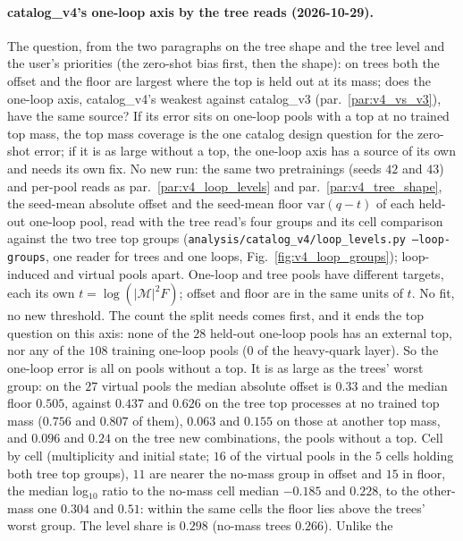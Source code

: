 \documentclass[11pt]{article}
\newcommand{\code}[1]{\texttt{#1}}
\begin{document}
\paragraph{catalog\_v4's one-loop axis by the tree reads (2026-10-29).}\label{par:v4_loop_groups} The question, from
the two paragraphs on the tree shape and the tree level and the user's priorities (the zero-shot bias first, then the
shape): on trees both the offset and the floor are largest where the top is held out at its mass; does the one-loop axis,
catalog\_v4's weakest against catalog\_v3 (par.~\ref{par:v4_vs_v3}), have the same source? If its error sits on one-loop
pools with a top at no trained top mass, the top mass coverage is the one catalog design question for the zero-shot
error; if it is as large without a top, the one-loop axis has a source of its own and needs its own fix. No new run:
the same two pretrainings (seeds $42$ and $43$) and per-pool reads as par.~\ref{par:v4_loop_levels} and
par.~\ref{par:v4_tree_shape}, the seed-mean absolute offset and the seed-mean floor $\mathrm{var}(q-t)$ of each held-out
one-loop pool, read with the tree read's four groups and its cell comparison against the two tree top groups
(\code{analysis/catalog\_v4/loop\_levels.py --loop-groups}, one reader for trees and one loops,
Fig.~\ref{fig:v4_loop_groups}); loop-induced and virtual pools apart. One-loop and tree pools have different targets,
each its own $t=\log(|\mathcal M|^2F)$; offset and floor are in the same units of $t$. No fit, no new threshold.
The count the split needs comes first, and it ends the top question on this axis: none of the $28$ held-out one-loop
pools has an external top, nor any of the $108$ training one-loop pools ($0$ of the heavy-quark layer). So the one-loop
error is all on pools without a top. It is as large as the trees' worst group: on the $27$ virtual pools the median
absolute offset is $0.33$ and the median floor $0.505$, against $0.437$ and $0.626$ on the tree top processes at no
trained top mass ($0.756$ and $0.807$ of them), $0.063$ and $0.155$ on those at another top mass, and $0.096$ and
$0.24$ on the tree new combinations, the pools without a top. Cell by cell (multiplicity and initial state; $16$ of the
virtual pools in the $5$ cells holding both tree top groups), $11$ are nearer the no-mass group in offset and $15$ in
floor, the median log$_{10}$ ratio to the no-mass cell median $-0.185$ and $0.228$, to the other-mass one $0.304$ and
$0.51$: within the same cells the floor lies above the trees' worst group. The level share is $0.298$ (no-mass trees $0.266$). Unlike the
\end{document}
